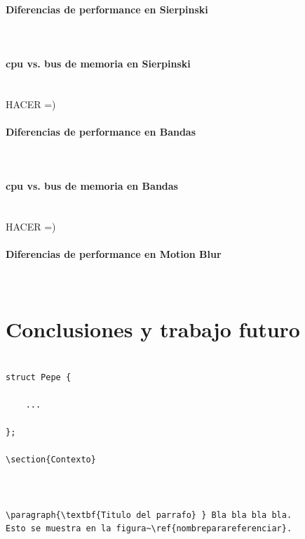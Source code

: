 \documentclass[a4paper]{article}
\begin{document}
\paragraph{\textbf{Diferencias de performance en Sierpinski} }
\\

\paragraph{\textbf{cpu vs. bus de memoria en Sierpinski} }
\\
HACER =)

\paragraph{\textbf{Diferencias de performance en Bandas} }
\\
\paragraph{\textbf{cpu vs. bus de memoria en Bandas} }
\\
HACER =)

\paragraph{\textbf{Diferencias de performance en Motion Blur} }
\\

\section{Conclusiones y trabajo futuro}

\begin{codesnippet}
\begin{verbatim}

struct Pepe {

    ...

};

\section{Contexto}



\paragraph{\textbf{Titulo del parrafo} } Bla bla bla bla.
Esto se muestra en la figura~\ref{nombreparareferenciar}.



\end{verbatim}
\end{codesnippet}
\end{document}
